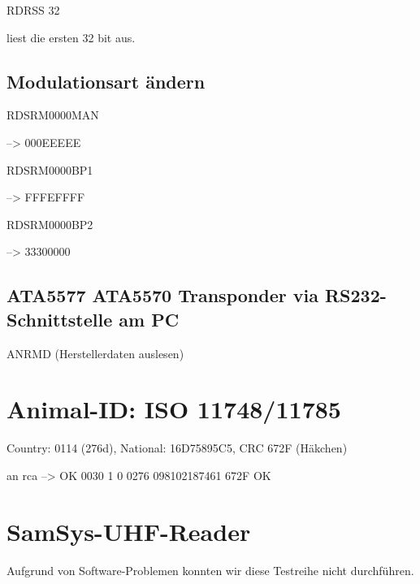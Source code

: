 \documentclass[paper=a4,fontsize=11pt,headsepline,footsepline,parskip=half]{scrartcl}
\begin{document}
RDRSS 32

liest die ersten 32 bit aus.

\subsection{Modulationsart ändern}

RDSRM0000MAN 

--> 000EEEEE

RDSRM0000BP1

--> FFFEFFFF

RDSRM0000BP2

--> 33300000

\subsection{ATA5577 ATA5570 Transponder via RS232-Schnittstelle am PC}

ANRMD (Herstellerdaten auslesen)

\section{Animal-ID: ISO 11748/11785}

Country: 0114 (276d), National: 16D75895C5, CRC 672F (Häkchen)

an rca --> OK 0030 1 0 0276 098102187461 672F OK

\section{SamSys-UHF-Reader}

Aufgrund von Software-Problemen konnten wir diese Testreihe nicht durchführen.
\end{document}
